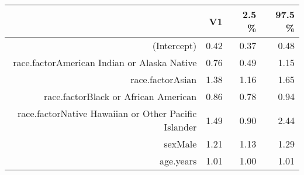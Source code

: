\begin{table}[ht]
\centering
\begin{tabular}{rrrr}
  \hline
 & V1 & 2.5 \% & 97.5 \% \\ 
  \hline
(Intercept) & 0.42 & 0.37 & 0.48 \\ 
  race.factorAmerican Indian or Alaska Native & 0.76 & 0.49 & 1.15 \\ 
  race.factorAsian & 1.38 & 1.16 & 1.65 \\ 
  race.factorBlack or African American & 0.86 & 0.78 & 0.94 \\ 
  race.factorNative Hawaiian or Other Pacific Islander & 1.49 & 0.90 & 2.44 \\ 
  sexMale & 1.21 & 1.13 & 1.29 \\ 
  age.years & 1.01 & 1.00 & 1.01 \\ 
   \hline
\end{tabular}
\end{table}

